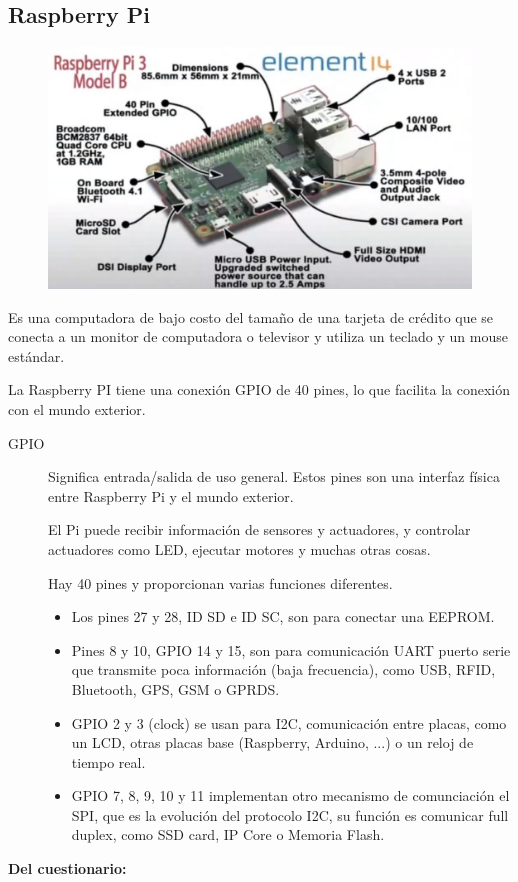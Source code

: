 \documentclass[12pt]{report} %
\begin{document}
\subsection{Raspberry Pi}

\begin{figure}[H]
	{\includegraphics[scale=.4]{2021-03-19 17_48_46-DSO Elementos Sistema embebido.mkv.png}}
\end{figure}

Es una computadora de bajo costo del tamaño de una tarjeta de crédito que se conecta a un monitor de computadora o televisor y utiliza un teclado y un mouse estándar.

La Raspberry PI tiene una conexión GPIO de 40 pines, lo que facilita la conexión con el mundo exterior.


	\begin{description}
		\item[GPIO] Significa entrada/salida de uso general. Estos pines son una interfaz física entre Raspberry Pi y el mundo exterior. 
		
		El Pi puede recibir información de sensores y actuadores, y controlar actuadores como LED, ejecutar motores y muchas otras cosas.
		
		Hay 40 pines y proporcionan varias funciones diferentes. 
		\begin{itemize}
			\item Los pines 27 y 28, ID SD e ID SC, son para conectar una EEPROM.
			\item Pines 8 y 10, GPIO 14 y 15, son para comunicación UART puerto serie que transmite poca información (baja frecuencia), como USB, RFID, Bluetooth, GPS, GSM o GPRDS.
			\item GPIO 2 y 3 (clock) se usan para I2C, comunicación entre placas, como un LCD, otras placas base (Raspberry, Arduino, ...) o un reloj de tiempo real.
			\item GPIO 7, 8, 9, 10 y 11 implementan otro mecanismo de comunciación el SPI, que es la evolución del protocolo I2C, su función es comunicar full duplex, como SSD card, IP Core o Memoria Flash.
		\end{itemize}
		  
	\end{description}  
\textbf{Del cuestionario:}
\end{document}
